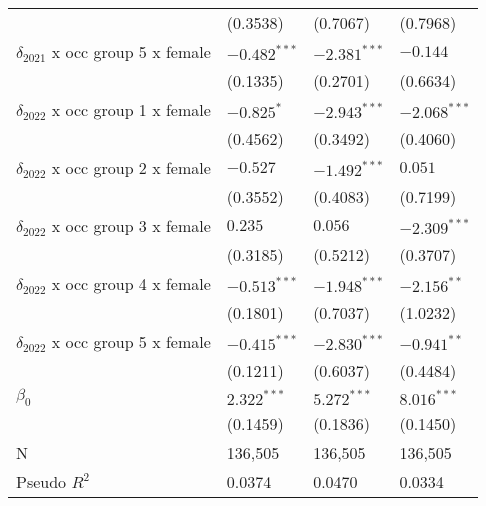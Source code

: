 \begin{tabular}{llll}
                                         &           (0.3538) &           (0.7067) &           (0.7968) \\
$\delta_{2021}$ x occ group 5 x female   &     $-0.482^{***}$ &     $-2.381^{***}$ &           $-0.144$ \\
                                         &           (0.1335) &           (0.2701) &           (0.6634) \\
$\delta_{2022}$ x occ group 1 x female   &         $-0.825^*$ &     $-2.943^{***}$ &     $-2.068^{***}$ \\
                                         &           (0.4562) &           (0.3492) &           (0.4060) \\
$\delta_{2022}$ x occ group 2 x female   &           $-0.527$ &     $-1.492^{***}$ &            $0.051$ \\
                                         &           (0.3552) &           (0.4083) &           (0.7199) \\
$\delta_{2022}$ x occ group 3 x female   &            $0.235$ &            $0.056$ &     $-2.309^{***}$ \\
                                         &           (0.3185) &           (0.5212) &           (0.3707) \\
$\delta_{2022}$ x occ group 4 x female   &     $-0.513^{***}$ &     $-1.948^{***}$ &      $-2.156^{**}$ \\
                                         &           (0.1801) &           (0.7037) &           (1.0232) \\
$\delta_{2022}$ x occ group 5 x female   &     $-0.415^{***}$ &     $-2.830^{***}$ &      $-0.941^{**}$ \\
                                         &           (0.1211) &           (0.6037) &           (0.4484) \\
$\beta_0$                                &      $2.322^{***}$ &      $5.272^{***}$ &      $8.016^{***}$ \\
                                         &           (0.1459) &           (0.1836) &           (0.1450) \\
N                                        &            136,505 &            136,505 &            136,505 \\
Pseudo $R^2$                             &             0.0374 &             0.0470 &             0.0334 \\
\bottomrule
\end{tabular}
